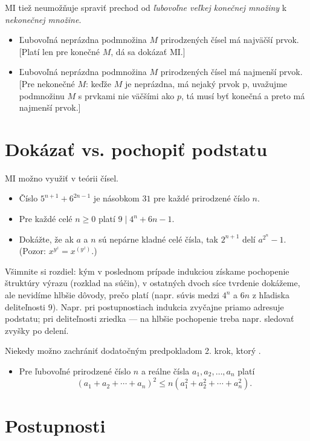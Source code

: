 \documentclass[a4paper, 11pt]{article}
\begin{document}
MI tiež neumožňuje spraviť prechod od \emph{ľubovoľne veľkej konečnej množiny} k \emph{nekonečnej množine}.
\begin{itemize}
\item Ľubovoľná neprázdna podmnožina $M$ prirodzených čísel má najväčší prvok. [Platí len pre konečné $M$, dá sa dokázať MI.]
\item Ľubovoľná neprázdna podmnožina $M$ prirodzených čísel má najmenší prvok. [Pre nekonečné $M$: keďže $M$ je neprázdna, má nejaký prvok p, uvažujme podmnožinu $M$ s prvkami nie väčšími ako $p$, tá musí byť konečná a preto má najmenší prvok.]
\end{itemize}

\section{Dokázať vs. pochopiť podstatu}

MI možno využiť v teórii čísel.
\begin{itemize}
\item Číslo $5^{n+1}+6^{2n-1}$ je násobkom $31$ pre každé prirodzené číslo $n$.
\item Pre každé celé $n\ge 0$ platí $9\mid 4^n+6n-1$.
\item Dokážte, že ak $a$ a $n$ sú nepárne kladné celé čísla, tak $2^{n+1}$ delí $a^{2^n}-1$. (Pozor: $x^{y^z} = x^{(y^z)}$.)
\end{itemize}
Všimnite si rozdiel: kým v poslednom prípade indukciou získame pochopenie štruktúry výrazu (rozklad na súčin), v ostatných dvoch síce tvrdenie dokážeme, ale nevidíme hlbšie dôvody, prečo platí (napr. súvis medzi $4^n$ a $6n$ z hľadiska deliteľnosti $9$). Napr. pri postupnostiach indukcia zvyčajne priamo adresuje podstatu; pri deliteľnosti zriedka --- na hlbšie pochopenie treba napr. sledovať zvyšky po delení.


Niekedy možno zachrániť dodatočným predpokladom 2. krok, ktorý .
\begin{itemize}
\item Pre ľubovoľné prirodzené číslo $n$ a reálne čísla $a_1,a_2,\dots,a_n$ platí
$$
(a_1+a_2+\cdots+a_n)^2\le n(a_1^2+a_2^2+\cdots+a_n^2).
$$
\end{itemize}


\section{Postupnosti}
\end{document}
